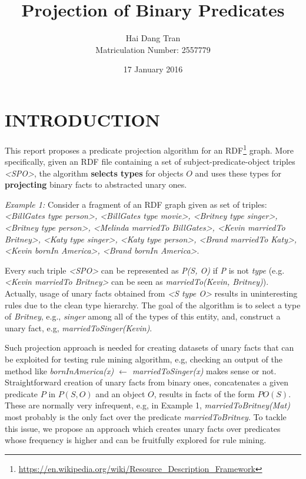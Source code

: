 \documentclass{acm_proc_article-sp}
\begin{document}
\title{Projection of Binary Predicates}
\author{
\alignauthor
Hai Dang Tran\\Matriculation Number: 2557779
}
\date{17 January 2016}

\maketitle

\section{INTRODUCTION}
This report proposes a predicate projection algorithm for an RDF\footnote{\url{https://en.wikipedia.org/wiki/Resource_Description_Framework}} graph. More specifically, given an RDF file containing a set of subject-predicate-object triples \textit{<SPO>}, the algorithm \textbf{selects types} for objects $O$ and uses these types for \textbf{projecting} binary facts to abstracted unary ones.

\textit{Example 1:} Consider a fragment of an RDF graph given as set of triples: \textit{<BillGates type person>, <BillGates type movie>, <Britney type singer>, <Britney type person>, <Melinda marriedTo BillGates>, <Kevin marriedTo Britney>, <Katy type singer>, <Katy type person>, <Brand marriedTo Katy>, <Kevin bornIn America>, <Brand bornIn America>}.

Every such triple \textit{<SPO>} can be represented as \textit{P(S, O)} if \textit{P} is not \textit{type} (e.g. \textit{<Kevin marriedTo Britney>} can be seen as \textit{marriedTo(Kevin, Britney)}). Actually, usage of unary facts obtained from \textit{<S type O>} results in uninteresting rules due to the clean type hierarchy. The goal of the algorithm is to select a type of \textit{Britney}, e.g., \textit{singer} among all of the types of this entity, and, construct a unary fact, e.g, \textit{marriedToSinger(Kevin)}.

Such projection approach is needed for creating datasets of unary facts that can be exploited for testing rule mining algorithm, e.g, checking an output of the method like \textit{bornInAmerica(x) $\leftarrow$ marriedToSinger(x)} makes sense or not. Straightforward creation of unary facts from binary ones, concatenates a given predicate $P$ in $P(S, O)$ and an object $O$, results in facts of the form $PO(S)$. These are normally very infrequent, e.g, in Example 1, \textit{marriedToBritney(Mat)} most probably is the only fact over the predicate \textit{marriedToBritney}.  To tackle this issue, we propose an approach which creates unary facts over predicates whose frequency is higher and can be fruitfully explored for rule mining.
\end{document}
